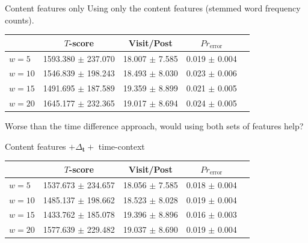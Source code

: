 \documentclass[12pt]{../presentation}
\begin{document}
\begin{frame}{Content features only}
	Using only the content features (stemmed word frequency counts).
	\begin{center}
		\footnotesize
	\begin{center}
		\scriptsize
		\begin{tabular}{ | l | c | c | c | c |}
			\hline
						&	        $T$-score &	       		Visit/Post	  & $Pr_{\text{error}}$\\
			\hline
 $w=5$	&	1593.380 $\pm$ 237.070	&  18.007 $\pm$ 7.585 &	0.019 $\pm$ 0.004  \\
$w=10$	&	1546.839 $\pm$ 198.243	&  18.493 $\pm$ 8.030 &	0.023 $\pm$ 0.006  \\
$w=15$	&	1491.695 $\pm$ 187.589	&  19.359 $\pm$ 8.899 &	0.021 $\pm$ 0.005  \\
$w=20$	&	1645.177 $\pm$ 232.365	&  19.017 $\pm$ 8.694 &	0.024 $\pm$ 0.005  \\
			\hline
		\end{tabular}
	\end{center}
	\end{center}
	Worse than the time difference approach, would using both sets of features help?
\end{frame}


\begin{frame}{Content features $+ \Delta_\mathbf{t} + $ time-context}
	\begin{center}
		\footnotesize
		\begin{tabular}{ | l | c | c | c | c |}
			\hline
						&	        $T$-score &	       		Visit/Post	  & $Pr_{\text{error}}$\\
			\hline
 $w=5$	&	1537.673 $\pm$ 234.657	&  18.056 $\pm$ 7.585 &	0.018 $\pm$ 0.004  \\
$w=10$	&	1485.137 $\pm$ 198.662	&  18.523 $\pm$ 8.028 &	0.019 $\pm$ 0.004  \\
$w=15$	&	1433.762 $\pm$ 185.078	&  19.396 $\pm$ 8.896 &	0.016 $\pm$ 0.003  \\
$w=20$	&	1577.639 $\pm$ 229.482	&  19.037 $\pm$ 8.690 &	0.019 $\pm$ 0.004  \\
			\hline
		\end{tabular}

	\end{center}
\end{frame}
\end{document}
